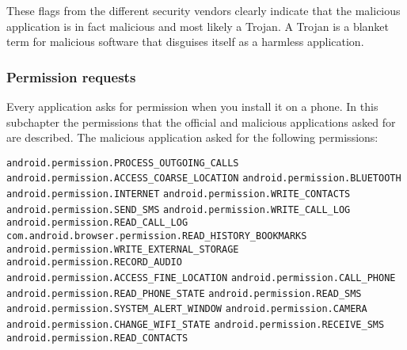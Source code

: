These flags from the different security vendors clearly indicate that the malicious application is in fact malicious and most likely a Trojan. A Trojan is a blanket term for malicious software that disguises itself as a harmless application.
\newpage
\subsubsection{Permission requests}
Every application asks for permission when you install it on a phone. In this subchapter the permissions that the official and malicious applications asked for are described.
The malicious application asked for the following permissions:

\texttt{android.permission.PROCESS\_OUTGOING\_CALLS}
\newline \texttt{android.permission.ACCESS\_COARSE\_LOCATION}
\newline \texttt{android.permission.BLUETOOTH}
\newline \texttt{android.permission.INTERNET}
\newline \texttt{android.permission.WRITE\_CONTACTS}
\newline \texttt{android.permission.SEND\_SMS}
\newline \texttt{android.permission.WRITE\_CALL\_LOG}
\newline \texttt{android.permission.READ\_CALL\_LOG}
\newline \texttt{com.android.browser.permission.READ\_HISTORY\_BOOKMARKS}
\newline \texttt{android.permission.WRITE\_EXTERNAL\_STORAGE}
\newline \texttt{android.permission.RECORD\_AUDIO}
\newline \texttt{android.permission.ACCESS\_FINE\_LOCATION}
\newline \texttt{android.permission.CALL\_PHONE}
\newline \texttt{android.permission.READ\_PHONE\_STATE}
\newline \texttt{android.permission.READ\_SMS}
\newline \texttt{android.permission.SYSTEM\_ALERT\_WINDOW}
\newline \texttt{android.permission.CAMERA}
\newline \texttt{android.permission.CHANGE\_WIFI\_STATE}
\newline \texttt{android.permission.RECEIVE\_SMS}
\newline \texttt{android.permission.READ\_CONTACTS}
